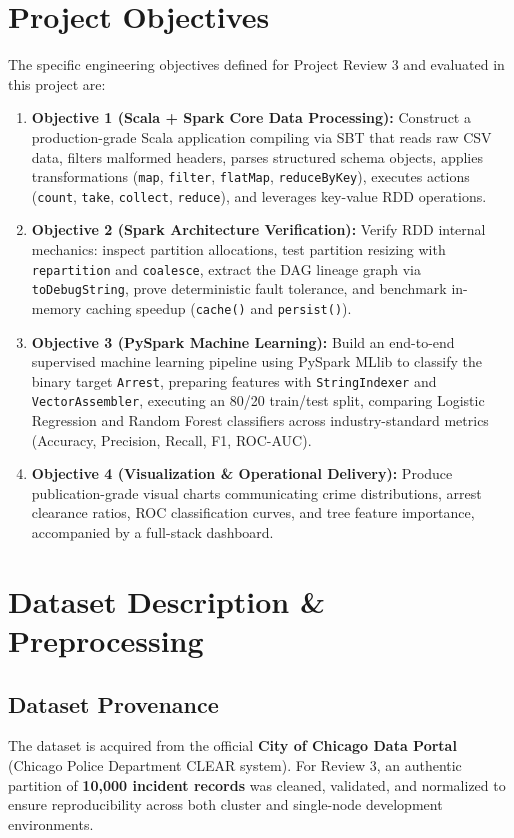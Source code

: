 \documentclass[11pt,a4paper]{article}
\begin{document}
\section{Project Objectives}
The specific engineering objectives defined for Project Review 3 and evaluated in this project are:
\begin{enumerate}[leftmargin=*]
    \item \textbf{Objective 1 (Scala + Spark Core Data Processing):} Construct a production-grade Scala application compiling via SBT that reads raw CSV data, filters malformed headers, parses structured schema objects, applies transformations (\texttt{map}, \texttt{filter}, \texttt{flatMap}, \texttt{reduceByKey}), executes actions (\texttt{count}, \texttt{take}, \texttt{collect}, \texttt{reduce}), and leverages key-value RDD operations.
    \item \textbf{Objective 2 (Spark Architecture Verification):} Verify RDD internal mechanics: inspect partition allocations, test partition resizing with \texttt{repartition} and \texttt{coalesce}, extract the DAG lineage graph via \texttt{toDebugString}, prove deterministic fault tolerance, and benchmark in-memory caching speedup (\texttt{cache()} and \texttt{persist()}).
    \item \textbf{Objective 3 (PySpark Machine Learning):} Build an end-to-end supervised machine learning pipeline using PySpark MLlib to classify the binary target \texttt{Arrest}, preparing features with \texttt{StringIndexer} and \texttt{VectorAssembler}, executing an 80/20 train/test split, comparing Logistic Regression and Random Forest classifiers across industry-standard metrics (Accuracy, Precision, Recall, F1, ROC-AUC).
    \item \textbf{Objective 4 (Visualization \& Operational Delivery):} Produce publication-grade visual charts communicating crime distributions, arrest clearance ratios, ROC classification curves, and tree feature importance, accompanied by a full-stack dashboard.
\end{enumerate}

\section{Dataset Description \& Preprocessing}
\subsection{Dataset Provenance}
The dataset is acquired from the official \textbf{City of Chicago Data Portal} (Chicago Police Department CLEAR system). For Review 3, an authentic partition of \textbf{10,000 incident records} was cleaned, validated, and normalized to ensure reproducibility across both cluster and single-node development environments.
\end{document}
